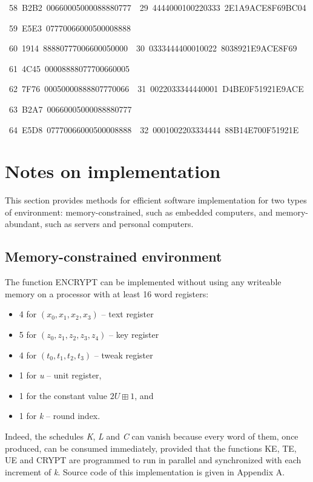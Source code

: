 \documentclass[a4paper,oneside,english]{amsart}
\numberwithin{equation}{section}
\numberwithin{figure}{section}
\newenvironment{lyxcode}
{\par\begin{list}{}{
\setlength{\rightmargin}{\leftmargin}
\setlength{\listparindent}{0pt}\raggedright
\setlength{\itemsep}{0pt}
\setlength{\parsep}{0pt}
\normalfont\ttfamily}\item[]}
{\end{list}}
\begin{document}
\begin{table}
\begin{lyxcode}
{\footnotesize{}~58~B2B2~00660005000088880777~~29~4444000100220333~2E1A9ACE8F69BC04}{\footnotesize \par}

{\footnotesize{}~59~E5E3~07770066000500008888}{\footnotesize \par}

{\footnotesize{}~60~1914~88880777006600050000~~30~0333444400010022~8038921E9ACE8F69}{\footnotesize \par}

{\footnotesize{}~61~4C45~00008888077700660005}{\footnotesize \par}

{\footnotesize{}~62~7F76~00050000888807770066~~31~0022033344440001~D4BE0F51921E9ACE}{\footnotesize \par}

{\footnotesize{}~63~B2A7~00660005000088880777}{\footnotesize \par}

{\footnotesize{}~64~E5D8~07770066000500008888~~32~0001002203334444~88B14E700F51921E}{\footnotesize \par}

\end{lyxcode}
\end{table}



\section{Notes on implementation}

This section provides methods for efficient software implementation
for two types of environment: memory-constrained, such as embedded
computers, and memory-abundant, such as servers and personal computers.


\subsection{Memory-constrained environment}

The function ENCRYPT can be implemented without using any writeable
memory on a processor with at least 16 word registers:
\begin{itemize}
\item 4 for $(x_{0},x_{1},x_{2},x_{3})$ -- text register
\item 5 for $(z_{0},z_{1},z_{2},z_{3},z_{4})$ -- key register
\item 4 for $(t_{0},t_{1},t_{2},t_{3})$ -- tweak register
\item 1 for \emph{u} -- unit register, 
\item 1 for the constant value $2U\boxplus1$, and
\item 1 for \emph{k} -- round index.
\end{itemize}
Indeed, the schedules \emph{K}, \emph{L} and \emph{C} can vanish because
every word of them, once produced, can be consumed immediately, provided
that the functions KE, TE, UE and CRYPT are programmed to run in parallel
and synchronized with each increment of \emph{k}. Source code of this
implementation is given in Appendix A.
\end{document}
